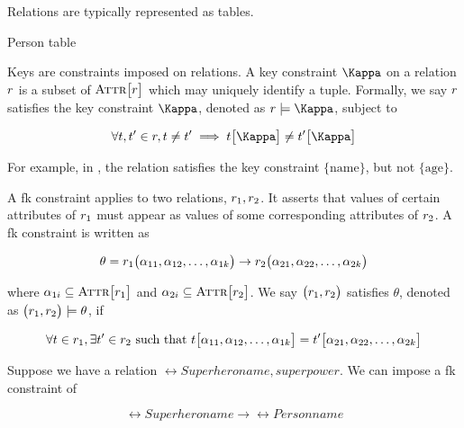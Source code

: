 	Relations are typically represented as tables.
	
	\begin{table}[!ht]
		\centering
		
		
		\caption{Person table}
		\label{tbl:person}
	\end{table}
	
	\begin{defn}[Keys]
	\label{def:keys}
		Keys are constraints imposed on relations.	A key constraint $\key$ on a relation $r$ is a subset of $\textsc{Attr}\bigl[r\bigr]$ which may uniquely identify a tuple.	Formally, we say $r$ satisfies the key constraint $\key$, denoted as $\relation \models \key$, subject to
		
		\[
			\forall \tuple, \tuple' \in \relation, \tuple \not= \tuple' \implies \tuple\bigl[\key\bigr] \not= \tuple'\bigl[\key\bigr]
		\]
		
		For example, in , the relation satisfies the key constraint $\bigl\{\mathrm{name}\bigr\}$, but not $\bigl\{\mathrm{age}\bigr\}$.
	\end{defn}
	
	\begin{defn}
	\label{def:foreign-keys}
		A \gls{fk} constraint applies to two relations, $r_1, r_2$.	 It asserts that values of certain attributes of $r_1$ must appear as values of some corresponding attributes of $r_2$.	 A \gls{fk} constraint is written as
		
		\[
			\theta = r_1\bigl(\alpha_{11}, \alpha_{12}, \dotsc, \alpha_{1k}\bigr) \rightarrow r_2\bigl(\alpha_{21}, \alpha_{22}, \dotsc, \alpha_{2k}\bigr)
		\]
		
		where $\alpha_{1i} \subseteq \textsc{Attr}\bigl[r_1\bigr]$ and $\alpha_{2i} \subseteq \textsc{Attr}\bigl[r_2\bigr]$.  We say $\bigl(r_1, r_2\bigr)$ satisfies $\theta$, denoted as $\bigl(r_1, r_2\bigr) \models \theta$, if
		
		\[
			\forall t \in r_1, \exists t' \in r_2 \text{ such that } t\bigl[\alpha_{11}, \alpha_{12}, \dotsc, \alpha_{1k}\bigr] = t'\bigl[\alpha_{21}, \alpha_{22}, \dotsc, \alpha_{2k}\bigr]
		\]
		
		\begin{ex}
			Suppose we have a relation $\rel{Superhero}{name, superpower}$.	 We can impose a \gls{fk} constraint of
			
			\[
				\rel{Superhero}{name} \rightarrow \rel{Person}{name}
			\]
		\end{ex}
	\end{defn}
	
